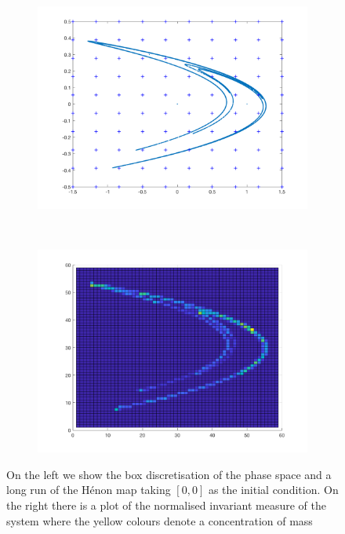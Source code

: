 \begin{figure}[H]
	\centering
	\begin{subfigure}[b]{0.4\textwidth}
		\includegraphics[width=\textwidth]{invarianthenon.png}
		\label{henon0}
	\end{subfigure}
	~ %
	\begin{subfigure}[b]{0.4\textwidth}
		\includegraphics[width=\textwidth]{henonmap.png}
		\label{fig:tiger}
	\end{subfigure}
	\caption{On the left we show the box discretisation of the phase space and a long run of the H\'{e}non map taking $[0,0]$ as the initial condition. On the right there is a plot of the normalised invariant measure of the system where the yellow colours denote a concentration of mass}\label{Henon}
\end{figure}

